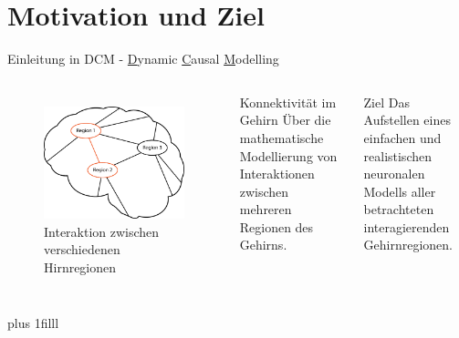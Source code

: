 \documentclass{beamer}
\begin{document}
\section{Motivation und Ziel}
	\begin{frame}{Einleitung in DCM - \underline{D}ynamic \underline{C}ausal \underline{M}odelling}
		\begin{columns}
		\column[t]{6cm}
		\begin{figure}
			\centering
			\includegraphics[width=0.85\linewidth]{res/brain_01.eps}
			\\ {\small Interaktion zwischen}\\ {\small verschiedenen Hirnregionen}
			\label{fig:brain_01}
		\end{figure}
		\column[t]{6cm}
		\begin{block}{\centering Konnektivität im Gehirn}
			\centering
			Über die mathematische Modellierung von Interaktionen zwischen mehreren Regionen des Gehirns.
		\end{block}
		\vspace{0.5cm}
		\begin{exampleblock}{\centering Ziel}
			 \centering
			 Das Aufstellen eines einfachen und realistischen neuronalen Modells aller betrachteten interagierenden Gehirnregionen.
		\end{exampleblock}
		\end{columns}
		\vskip0pt plus 1filll
	\end{frame}
	
\end{document}
